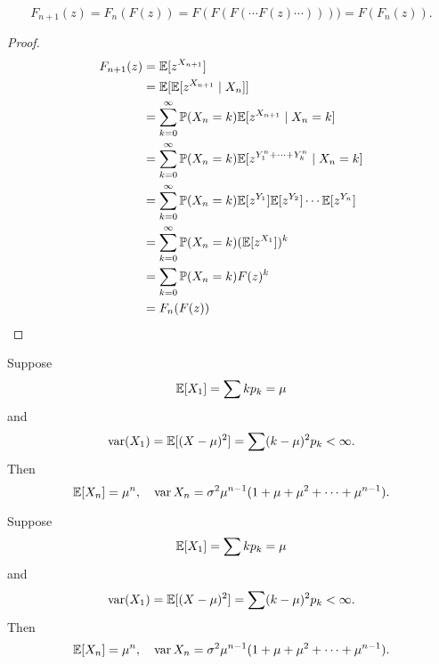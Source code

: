 %
\begin{note}
  \begin{field}
    \begin{thm}
      \[
        F_{n + 1}(z) = F_n(F(z)) = F(F(F(\cdots F(z) \cdots )))) = F(F_n(z)).
      \]
    \end{thm}
  \end{field}
  \begin{field}
    \begin{proof}
      \begin{align*}
        F_{n + 1}(z) &= \mathbb{E}[z^{X_{n + 1}}]\\
        &= \mathbb{E}[\mathbb{E}[z^{X_{n + 1}}\mid X_n]]\\
        &= \sum_{k = 0}^\infty \mathbb{P}(X_n = k)\mathbb{E}[z^{X_{n + 1}}\mid X_n = k]\\
        &= \sum_{k = 0}^\infty \mathbb{P}(X_n = k)\mathbb{E}[z^{Y_1^n + \cdots + Y_k^n}\mid X_n = k]\\
        &= \sum_{k = 0}^\infty \mathbb{P}(X_n = k)\mathbb{E}[z^{Y_1}]\mathbb{E}[z^{Y_2}]\cdots\mathbb{E}[z^{Y_n}]\\
        &= \sum_{k = 0}^\infty \mathbb{P}(X_n = k)(\mathbb{E}[z^{X_1}])^k\\
        &= \sum_{k = 0}\mathbb{P}(X_n = k)F(z)^k\\
        &= F_n(F(z))
      \end{align*}
    \end{proof}
  \end{field}
  \xplain{}%
\end{note}

\begin{note}
  \begin{field}
    \begin{thm}
      Suppose
      \[
        \mathbb{E}[X_1] = \sum k p_k = \mu
      \]
      and
      \[
        \operatorname{var} (X_1) = \mathbb{E}[(X - \mu)^2] = \sum (k - \mu)^2 p_k < \infty.
      \]
      Then
      \[
        \mathbb{E}[X_n] = \mu^n,\quad \operatorname{var} X_n = \sigma^2\mu^{n - 1}(1 + \mu + \mu^2 + \cdots + \mu^{n - 1}).
      \]
    \end{thm}
  \end{field}
  \begin{field}
    \begin{thm}
      Suppose
      \[
        \mathbb{E}[X_1] = \sum k p_k = \mu
      \]
      and
      \[
        \operatorname{var} (X_1) = \mathbb{E}[(X - \mu)^2] = \sum (k - \mu)^2 p_k < \infty.
      \]
      Then
      \[
        \mathbb{E}[X_n] = \mu^n,\quad \operatorname{var} X_n = \sigma^2\mu^{n - 1}(1 + \mu + \mu^2 + \cdots + \mu^{n - 1}).
      \]
    \end{thm}
  \end{field}
  \xplain{}%
\end{note}

